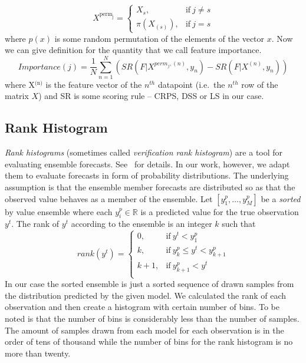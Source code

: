 \documentclass[12pt,a4paper,twoside]{scrartcl}
\numberwithin{equation}{section}
\begin{document}
\begin{equation}
  X^{\text{perm}_{\text{j}}} = 
  \begin{cases}
    X_{s},        & \text{if}\  j \neq s \\
    \pi(X_{(s)}), & \text{if}\  j = s
  \end{cases}
\end{equation}
where \(p(x)\) is some random permutation of the elements of the vector \(x\). Now we can give definition for the quantity that we call feature importance.
\begin{equation}
  \textit{Importance}(j) = \frac{1}{N}\sum_{n=1}^N (SR(F|X^{perm_j,(n)}, y_n) - SR(F|X^{(n)}, y_n) )
\end{equation}
where X\(^{\text{(n)}}\) is the feature vector of the \(n^{th}\) datapoint (i.e.\ the \(n^{th}\) row of the matrix \(X\)) and SR is some scoring rule -- CRPS, DSS or LS in our case.
\subsection{Rank Histogram}\label{sec:rank-hist}
\emph{Rank histograms} (sometimes called \emph{verification rank histogram}) are a tool for evaluating ensemble forecasts. See~\cite{hamill2001} for details. In our work, however, we adapt them to evaluate forecasts in form of probability distributions. The underlying assumption is that the ensemble member forecasts are distributed so as that the observed value behaves as a member of the ensemble. Let \([y_1^p,\ldots , y_M^p]\) be a \emph{sorted} by value ensemble where each \(y_i^p\in\mathbb{R}\) is a predicted value for the true observation \(y^t\). The rank of \(y^t\) according to the ensemble is an integer \(k\) such that
\begin{equation}
  rank(y^t)=
  \begin{cases}
    0,   & \text{if}\  y^t < y_1^p \\
    k,   & \text{if}\  y_{k}^p \leq y^t < y_{k+1}^p  \\
    k+1, & \text{if}\  y_{k+1}^p <  y^t  \\
  \end{cases}
\end{equation}
In our case the sorted ensemble is just a sorted sequence of drawn samples from the distribution predicted by the given model. We calculated the rank of each observation and then create a histogram with certain number of bins. To be noted is that the number of bins is considerably less than the number of samples. The amount of samples drawn from each model for each observation is in the order of tens of thousand while the number of bins for the rank histogram is no more than twenty.
\end{document}
